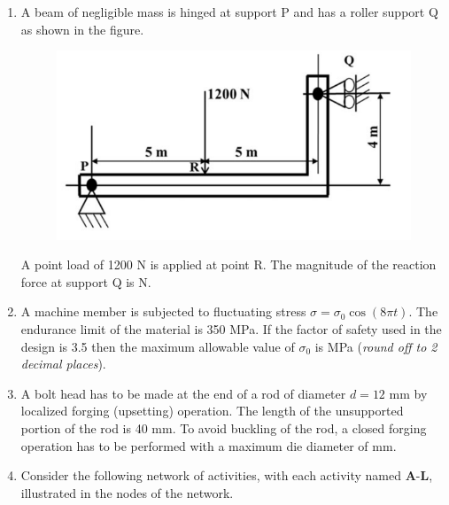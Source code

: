 \documentclass[12pt,onecolumn]{article}
\begin{document}
\begin{enumerate}
    \item A beam of negligible mass is hinged at support P and has a roller support Q as shown in the figure.
          \begin{figure}[H]
              \centering
              \includegraphics[scale=0.5]{q20s2}
              \label{fig:q20s2}
          \end{figure}
          A point load of 1200 N is applied at point R. The magnitude of the reaction force at support Q is \underline{\hspace{2cm}} N.

    \item A machine member is subjected to fluctuating stress $\sigma = \sigma_0 \cos(8\pi t)$. The endurance limit of the material is 350 MPa. If the factor of safety used in the design is 3.5 then the maximum allowable value of $\sigma_0$ is \underline{\hspace{2cm}} MPa (\textit{round off to 2 decimal places}).

    \item A bolt head has to be made at the end of a rod of diameter $d = 12$ mm by localized forging (upsetting) operation. The length of the unsupported portion of the rod is 40 mm. To avoid buckling of the rod, a closed forging operation has to be performed with a maximum die diameter of \underline{\hspace{2cm}} mm.

    \item Consider the following network of activities, with each activity named $\mathbf{A}$-$\mathbf{L}$, illustrated in the nodes of the network.


\end{enumerate}
\end{document}
